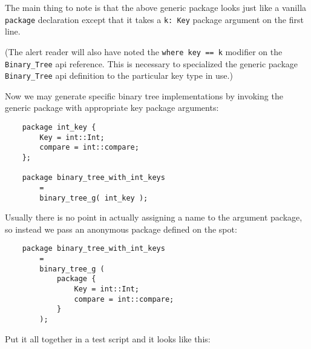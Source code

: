 The main thing to note is that the above generic package looks just like a 
vanilla {\tt package} declaration except that it takes a {\tt k: Key} 
package argument on the first line.

(The alert reader will also have noted the {\tt where key == k} modifier 
on the {\tt Binary\_Tree} api reference.  This is necessary to specialized 
the generic package {\tt Binary\_Tree} api definition to the particular key type 
in use.)

Now we may generate specific binary tree implementations by invoking the 
generic package with appropriate key package arguments:

\begin{verbatim}
    package int_key {
        Key = int::Int;
        compare = int::compare;
    };

    package binary_tree_with_int_keys
        =
        binary_tree_g( int_key );
\end{verbatim}

Usually there is no point in actually assigning a name to the 
argument package, so instead we pass an anonymous package 
defined on the spot:

\begin{verbatim}
    package binary_tree_with_int_keys
        =
        binary_tree_g (
            package {
                Key = int::Int;
                compare = int::compare;
            }
        );
\end{verbatim}



Put it all together in a test script and it looks like this:

